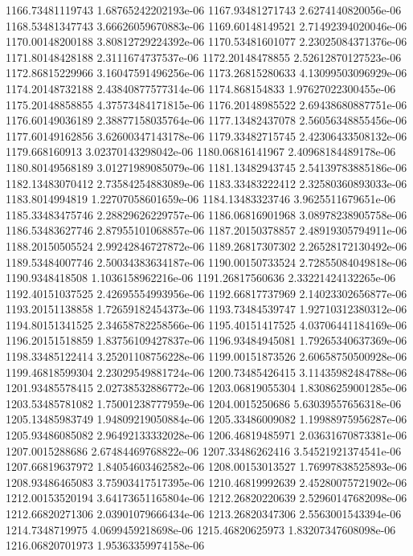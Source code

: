 {1166.73481119743 1.68765242202193e-06
1167.93481271743 2.6274140820056e-06
1168.53481347743 3.66626059670883e-06
1169.60148149521 2.71492394020046e-06
1170.00148200188 3.80812729224392e-06
1170.53481601077 2.23025084371376e-06
1171.80148428188 2.3111674737537e-06
1172.20148478855 2.52612870127523e-06
1172.86815229966 3.16047591496256e-06
1173.26815280633 4.13099503096929e-06
1174.20148732188 2.43840877577314e-06
1174.868154833 1.97627022300455e-06
1175.20148858855 4.37573484171815e-06
1176.20148985522 2.69438680887751e-06
1176.60149036189 2.38877158035764e-06
1177.13482437078 2.56056348855456e-06
1177.60149162856 3.62600347143178e-06
1179.33482715745 2.42306433508132e-06
1179.668160913 3.02370143298042e-06
1180.06816141967 2.40968184489178e-06
1180.80149568189 3.01271989085079e-06
1181.13482943745 2.54139783885186e-06
1182.13483070412 2.73584254883089e-06
1183.33483222412 2.32580360893033e-06
1183.8014994819 1.22707058601659e-06
1184.13483323746 3.9625511679651e-06
1185.33483475746 2.28829626229757e-06
1186.06816901968 3.08978238905758e-06
1186.53483627746 2.87955101068857e-06
1187.20150378857 2.48919305794911e-06
1188.20150505524 2.99242846727872e-06
1189.26817307302 2.26528172130492e-06
1189.53484007746 2.50034383634187e-06
1190.00150733524 2.72855084049818e-06
1190.9348418508 1.1036158962216e-06
1191.26817560636 2.33221424132265e-06
1192.40151037525 2.42695554993956e-06
1192.66817737969 2.14023302656877e-06
1193.20151138858 1.72659182454373e-06
1193.73484539747 1.92710312380312e-06
1194.80151341525 2.34658782258566e-06
1195.40151417525 4.03706441184169e-06
1196.20151518859 1.83756109427837e-06
1196.93484945081 1.79265340637369e-06
1198.33485122414 3.25201108756228e-06
1199.00151873526 2.60658750500928e-06
1199.46818599304 2.23029549881724e-06
1200.73485426415 3.11435982484788e-06
1201.93485578415 2.02738532886772e-06
1203.06819055304 1.83086259001285e-06
1203.53485781082 1.75001238777959e-06
1204.0015250686 5.63039557656318e-06
1205.13485983749 1.94809219050884e-06
1205.33486009082 1.19988975956287e-06
1205.93486085082 2.96492133332028e-06
1206.46819485971 2.03631670873381e-06
1207.0015288686 2.67484469768822e-06
1207.33486262416 3.54521921374541e-06
1207.66819637972 1.84054603462582e-06
1208.00153013527 1.76997838525893e-06
1208.93486465083 3.75903417517395e-06
1210.46819992639 2.45280075721902e-06
1212.00153520194 3.64173651165804e-06
1212.26820220639 2.52960147682098e-06
1212.66820271306 2.03901079666434e-06
1213.26820347306 2.5563001543394e-06
1214.7348719975 4.0699459218698e-06
1215.46820625973 1.83207347608098e-06
1216.06820701973 1.95363359974158e-06
}
